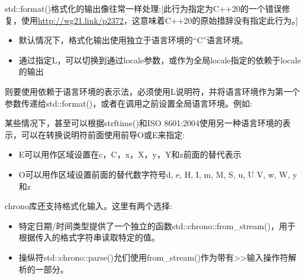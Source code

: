 std::format()格式化的输出像往常一样处理:[此行为指定为C++20的一个错误修复，使用\url{http://wg21.link/p2372}，这意味着C++20的原始措辞没有指定此行为。]

\begin{itemize}
\item
默认情况下，格式化输出使用独立于语言环境的“C”语言环境。

\item
通过指定L，可以切换到通过locale参数，或作为全局locale指定的依赖于locale的输出
\end{itemize}

则要使用依赖于语言环境的表示法，必须使用L说明符，并将语言环境作为第一个参数传递给std::format()，或者在调用之前设置全局语言环境。例如:


某些情况下，甚至可以根据strftime()和ISO 8601:2004使用另一种语言环境的表示，可以在转换说明符前面使用前导O或E来指定:

\begin{itemize}
\item
E可以用作区域设置在c，C，x，X，y，Y和z前面的替代表示

\item
O可以用作区域设置前面的替代数字符号d, e, H, I, m, M, S, u, U V, w, W, y和z
\end{itemize}


chrono库还支持格式化输入。这里有两个选择:

\begin{itemize}
\item
特定日期/时间类型提供了一个独立的函数std::chrono::from\_stream()，用于根据传入的格式字符串读取特定的值。

\item
操纵符std::chrono::parse()允们使用from\_stream()作为带有>{}>输入操作符解析的一部分。
\end{itemize}

